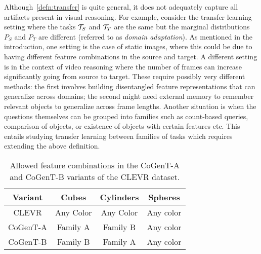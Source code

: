 Although~\cref{defn:transfer} is quite general, it does not adequately capture all artifacts present in visual reasoning.
For example, consider the transfer learning setting where the tasks $\mathcal{T}_S$ and $\mathcal{T}_T$ are the same
but the marginal distributions $P_S$ and $P_T$ are different (referred to as \emph{domain adaptation}).
As mentioned in the introduction, one setting is the case of static images,
where this could be due to having different feature combinations in the source and target.
A different setting is in the context of video reasoning where the number of frames can increase significantly going from source to target.
These require possibly very different methods: the first involves building disentangled feature representations that can generalize across
domains; the second might need external memory to remember relevant objects to generalize across frame lengths.
Another situation is when the questions themselves can be grouped into families such as count-based queries,
comparison of objects, or existence of objects with certain features etc.
This entails studying transfer learning between families of tasks which requires extending the above definition.

\begin{table}[b!]
	\centering
	\begin{tabular}{cccc}
		\toprule
		Variant	& Cubes	& Cylinders &	Spheres	\\
		\midrule
		CLEVR &  Any Color  & Any Color 	&	Any color  \\
		CoGenT-A &  Family A  & Family B 	&	Any color  \\
		CoGenT-B	&	Family B  &	Family A	&	Any color \\
		\bottomrule
	\end{tabular}
	\caption{Allowed feature combinations in the CoGenT-A and CoGenT-B variants of the CLEVR dataset.}%
	\label{tab:cogent_conditions}
\end{table}

